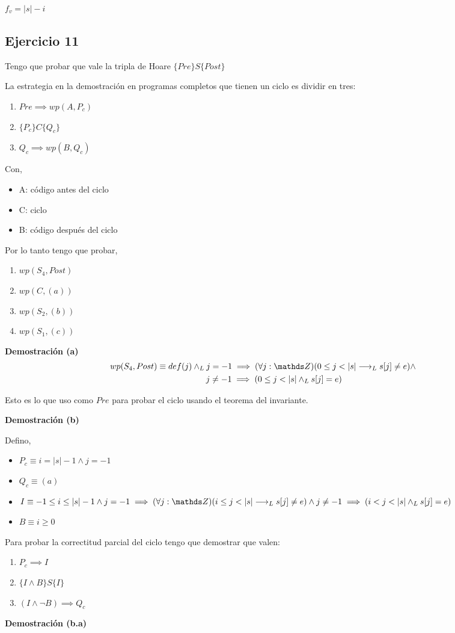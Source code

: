 $ f_v = |s| - i $

\subsection{Ejercicio 11}

Tengo que probar que vale la tripla de Hoare $ \{Pre\} S \{Post\} $

La estrategia en la demostración en programas completos que tienen un ciclo es dividir en tres:
\begin{enumerate}
    \item $ Pre \implies wp(A, P_c) $
    \item $ \{P_c\} C \{Q_c\} $
    \item $ Q_c \implies wp(B, Q_c) $
\end{enumerate}
Con,
\begin{itemize}
    \item A: código antes del ciclo
    \item C: ciclo
    \item B: código después del ciclo
\end{itemize}
Por lo tanto tengo que probar,
\begin{enumerate}[label=(\alph*)]
    \item $ wp(S_4, Post) $
    \item $ wp(C, (a)) $
    \item $ wp(S_2, (b)) $
    \item $ wp(S_1, (c)) $
\end{enumerate}

\textbf{Demostración (a)}
\begin{align*}
    wp(S_4, Post) &\equiv def(j) \yLuego j = -1 \implies (\forall j: \ent)(0 \leq j < |s| \implicaLuego s[j] \neq e) \wedge \\
    &\qquad \qquad \quad \; \; \; j \neq -1 \implies (0 \leq j < |s| \yLuego s[j] = e)
\end{align*}

Esto es lo que uso como $Pre$ para probar el ciclo usando el teorema del invariante.

\textbf{Demostración (b)}

Defino,
\begin{itemize}
    \item $ P_c \equiv i = |s| - 1 \wedge j = -1 $
    \item $ Q_c \equiv (a) $
    \item $ I \equiv -1 \leq i \leq |s|-1 \wedge j = -1 \implies (\forall j: \ent)(i \leq j < |s| \implicaLuego s[j] \neq e) \wedge
    j \neq -1 \implies (i < j < |s| \yLuego s[j] = e) $
    \item $ B \equiv i \geq 0 $
\end{itemize}
Para probar la correctitud parcial del ciclo tengo que demostrar que valen:
\begin{enumerate}[label=(\alph*)]
    \item $ P_c \implies I $
    \item $ \{ I \wedge B \} S \{ I \} $
    \item $ (I \wedge \neg B) \implies Q_c $
\end{enumerate}
\textbf{Demostración (b.a)}

